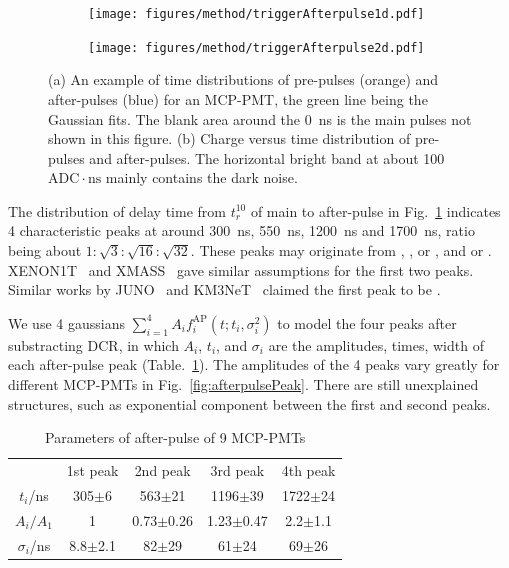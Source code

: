 \begin{figure}[!htbp]
    \centering
    \begin{subfigure}[t]{\LF\textwidth}
        \texttt{[image: figures/method/triggerAfterpulse1d.pdf]}
        \caption{}%
        \label{fig:afterpulse1d}
    \end{subfigure}
    \begin{subfigure}[t]{\LF\textwidth}
        \texttt{[image: figures/method/triggerAfterpulse2d.pdf]}
        \caption{}
        \label{fig:afterpulse2d}
    \end{subfigure}
    \caption{(a) An example of time distributions of pre-pulses (orange) and after-pulses (blue) for an MCP-PMT, the green line being the Gaussian fits. The blank area around the \SI{0}{ns} is the main pulses not shown in this figure. (b) Charge versus time distribution of pre-pulses and after-pulses. The horizontal bright band at about 100\,$\mathrm{ADC}\cdot \mathrm{ns}$ mainly contains the dark noise.}
\end{figure}

The distribution of delay time from $t_r^{10}$ of main to after-pulse in Fig.~\ref{fig:afterpulse1d} indicates 4 characteristic peaks at around \SI{300}{ns}, \SI{550}{ns}, \SI{1200}{ns} and \SI{1700}{ns}, ratio being about $1:\sqrt{3}:\sqrt{16}:\sqrt{32}$. These peaks may originate from , ,  or , and  or . XENON1T~\cite{XENON1TTesting} and XMASS~\cite{Abe_2020} gave similar assumptions for the first two peaks. Similar works by JUNO~\cite{Zhao:2022gks} and KM3NeT~\cite{KM3NetTesting} claimed the first peak to be .%

We use 4 gaussians $\sum_{i=1}^{4}{A_if_i^{\mathrm{AP}}(t;t_i,\sigma_i^2)}$ to model the four peaks after substracting DCR,
in which $A_i$, $t_i$, and $\sigma_i$ are the amplitudes, times, width of each after-pulse peak (Table.~\ref{tab:afterpulse}). The amplitudes of the 4 peaks vary greatly for different MCP-PMTs in Fig.~\ref{fig:afterpulsePeak}. There are still unexplained structures, such as exponential component between the first and second peaks.
\begin{table}
    \centering
    \caption{Parameters of after-pulse of 9 MCP-PMTs}
    \label{tab:afterpulse}
    \begin{tabular}{c|c|c|c|c}
        \hline
        &1st peak&2nd peak&3rd peak&4th peak\\
        $t_i$/ns&305$\pm$6&563$\pm$21&1196$\pm$39&1722$\pm$24\\
        $A_i/A_1$&1&0.73$\pm$0.26&1.23$\pm$0.47&2.2$\pm$1.1\\
        $\sigma_i$/ns&8.8$\pm$2.1&82$\pm$29&61$\pm$24&69$\pm$26\\
        \hline
    \end{tabular}
\end{table}

